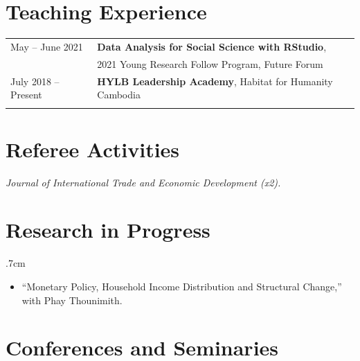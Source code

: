 \documentclass[10pt,a4paper]{article}
\begin{document}
\section*{Teaching Experience}
	\vspace{-0em}
	\noindent 
	\begin{tabular}{@{} l l}
		
		\hspace{1em} May -- June 2021 & \textbf{Data Analysis for Social Science with RStudio}, \\
		& 2021 Young Research Follow Program, Future Forum \\
			
		\hspace{1em} July 2018 -- Present    & \textbf{HYLB Leadership Academy}, Habitat for Humanity Cambodia \\
		& \\
		
	\end{tabular} 
	\vspace{-1em}	
\section*{Referee Activities}
\textit{Journal of International Trade and Economic Development (x2).
}
\vspace{-1.em}
					
\section*{Research in Progress}
		\vspace{-0.5em}
		\begin{adjustwidth}{.7cm}{}
			\begin{itemize}[label={},itemindent=-2em,leftmargin=2em]
			
			\item “Monetary Policy, Household Income Distribution and Structural Change,'' with Phay Thounimith. 
		
			\end{itemize}
		\end{adjustwidth}
		\vspace{-1em}
\section*{Conferences and Seminaries}
\vspace{-0.5em}
\end{document}
